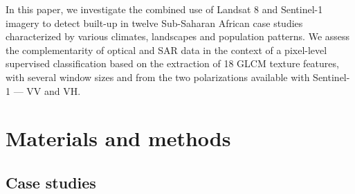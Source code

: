 \documentclass[remotesensing,article,submit,moreauthors,pdftex,10pt,a4paper]{Definitions/mdpi}
\begin{document}
In this paper, we investigate the combined use of Landsat 8 and Sentinel-1
imagery to detect built-up in twelve Sub-Saharan African case studies
characterized by various climates, landscapes and population patterns. We assess
the complementarity of optical and SAR data in the context of a pixel-level
supervised classification based on the extraction of 18 GLCM texture features,
with several window sizes and from the two polarizations available with
Sentinel-1 --- VV and VH.

\section{Materials and methods}

\subsection{Case studies}
\end{document}
